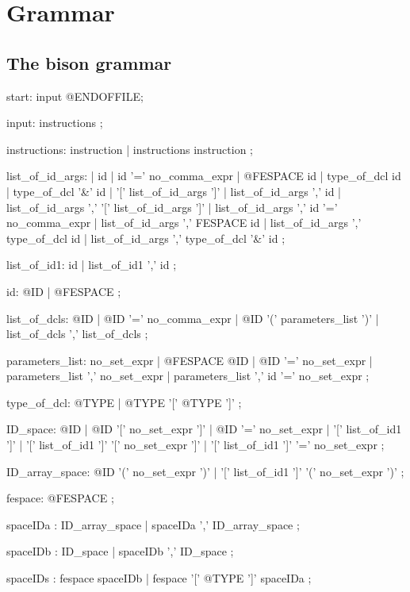 \documentclass[a4paper,twoside,12pt]{book}
\begin{document}
\section{Grammar}

\subsection{The bison grammar}
{\small
\bFF

start:   input @ENDOFFILE;

input:   instructions ;

instructions:  instruction
        | instructions  instruction   ;

list_of_id_args:
            | id
            | id '=' no_comma_expr
            | @FESPACE id
            | type_of_dcl id
            | type_of_dcl '&' id
            | '[' list_of_id_args ']'
            | list_of_id_args ',' id
            | list_of_id_args ',' '[' list_of_id_args ']'
            | list_of_id_args ',' id '=' no_comma_expr
            | list_of_id_args ',' FESPACE id
            | list_of_id_args ',' type_of_dcl id
            | list_of_id_args ',' type_of_dcl '&' id ;

list_of_id1:  id
            | list_of_id1 ',' id   ;

id: @ID | @FESPACE ;

list_of_dcls:    @ID
              |  @ID '='   no_comma_expr
              |  @ID  '(' parameters_list ')'
              |  list_of_dcls ',' list_of_dcls  ;


parameters_list:
           no_set_expr
        |  @FESPACE  @ID
        |  @ID '=' no_set_expr
        | parameters_list ',' no_set_expr
        | parameters_list ',' id '=' no_set_expr ;

type_of_dcl:   @TYPE
             | @TYPE '[' @TYPE ']' ;

ID_space:
    @ID
 |  @ID '[' no_set_expr ']'
 |  @ID '=' no_set_expr
 |  '[' list_of_id1 ']'
 |  '[' list_of_id1 ']' '[' no_set_expr ']'
 |  '[' list_of_id1 ']' '=' no_set_expr ;

ID_array_space:
    @ID '(' no_set_expr ')'
 |  '[' list_of_id1 ']' '(' no_set_expr ')' ;

fespace: @FESPACE ;

spaceIDa  :      ID_array_space
            |    spaceIDa ',' ID_array_space  ;

spaceIDb  :      ID_space
            |    spaceIDb ',' ID_space ;

spaceIDs :    fespace               spaceIDb
           |  fespace '[' @TYPE ']'  spaceIDa    ;

}
\end{document}
